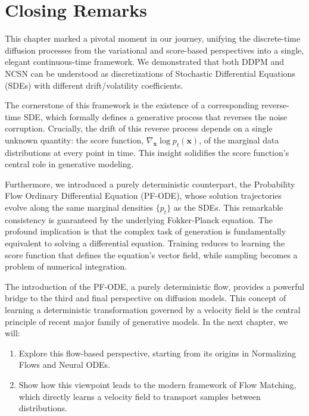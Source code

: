 \clearpage
\newpage

\section{Closing Remarks}


This chapter marked a pivotal moment in our journey, unifying the discrete-time diffusion processes from the variational and score-based perspectives into a single, elegant continuous-time framework. We demonstrated that both DDPM and NCSN can be understood as discretizations of Stochastic Differential Equations (SDEs) with different drift/volatility coefficients.

The cornerstone of this framework is the existence of a corresponding reverse-time SDE, which formally defines a generative process that reverses the noise corruption. Crucially, the drift of this reverse process depends on a single unknown quantity: the score function, $\nabla_{\mathbf{x}}\log{p_{t}(\mathbf{x})}$, of the marginal data distributions at every point in time. This insight solidifies the score function's central role in generative modeling.

Furthermore, we introduced a purely deterministic counterpart, the Probability Flow Ordinary Differential Equation (PF-ODE), whose solution trajectories evolve along the same marginal densities $\{p_{t}\}$ as the SDEs. This remarkable consistency is guaranteed by the underlying Fokker-Planck equation. The profound implication is that the complex task of generation is fundamentally equivalent to solving a differential equation. Training reduces to learning the score function that defines the equation's vector field, while sampling becomes a problem of numerical integration.

The introduction of the PF-ODE, a purely deterministic flow, provides a powerful bridge to the third and final perspective on diffusion models. This concept of learning a deterministic transformation governed by a velocity field is the central principle of recent major family of generative models. In the next chapter, we will:
\begin{enumerate}
    \item Explore this flow-based perspective, starting from its origins in Normalizing Flows and Neural ODEs.
    \item Show how this viewpoint leads to the modern framework of Flow Matching, which directly learns a velocity field to transport samples between distributions.
\end{enumerate}

